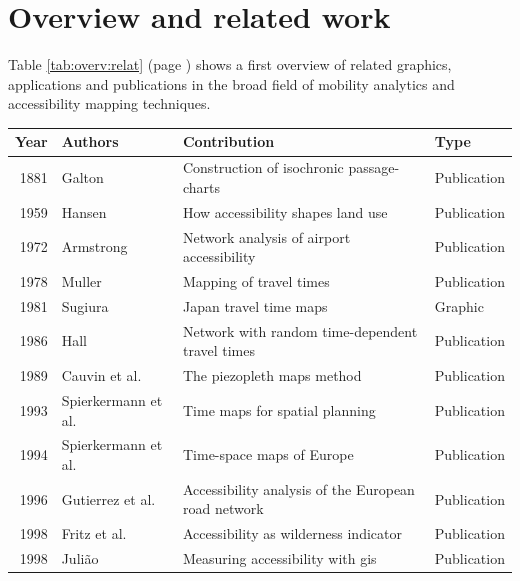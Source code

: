 
\cleardoublepage
\chapter{Overview and related work}
  \label{chap:overv}

  Table \ref{tab:overv:relat} (page \pageref{tab:overv:relat}) shows a first
  overview of related graphics, applications and publications in the broad
  field of mobility analytics and accessibility mapping techniques.\par

  \begin{table}[htp]
    \tiny \centering
    \begin{tabular}{r|l|l|l}
     \textbf{Year} & \textbf{Authors} & \textbf{Contribution} & \textbf{Type} \\
     \hline
      1881 & Galton \cite{galton1881construction} & Construction of isochronic passage-charts  & Publication  \\
      1959 & Hansen \cite{hansen1959accessibility} & How accessibility shapes land use & Publication \\
      1972 & Armstrong \cite{armstrong1972network} & Network analysis of airport accessibility  & Publication  \\
      1978 & Muller \cite{muller1978mapping} & Mapping of travel times  & Publication  \\
      1981 & Sugiura \cite{Sugiura1981} & Japan travel time maps  & Graphic  \\
      1986 & Hall \cite{hall1986fastest} & Network with random time-dependent travel times  &  Publication \\
      1989 & Cauvin et al. \cite{cauvin1989cartographic} & The piezopleth maps method  & Publication  \\
      1993 & Spierkermann et al. \cite{spiekermann1993zeitkarten} & Time maps for spatial planning  & Publication  \\
      1994 & Spierkermann et al. \cite{spiekermann1994new} & Time-space maps of Europe  & Publication  \\
      1996 & Gutierrez et al. \cite{gutierrez1996accessibility} & Accessibility analysis of the European road network  & Publication  \\
      1998 & Fritz et al. \cite{fritz1998accessibility} &  Accessibility as wilderness indicator  & Publication  \\
      1998 & Juli{\~a}o \cite{juliao1998measuring} &  Measuring accessibility with \acrshort{gis} & Publication  \\

\end{tabular}
\end{table}
